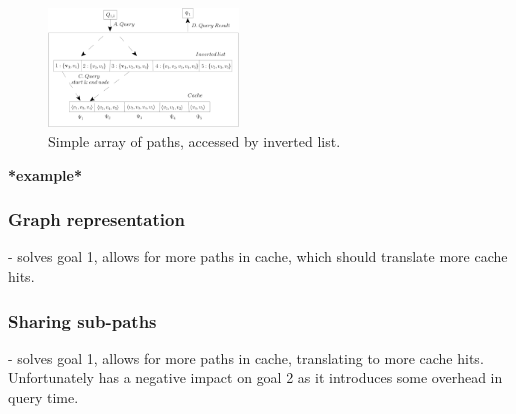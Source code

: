 \begin{figure}[hbt]
  \center
        \includegraphics[width=0.45\textwidth]{figures/cachearrayinvertlist.pdf}
        \caption{Simple array of paths, accessed by inverted list.}
  \label{fig:cacheinvertlist}
\end{figure}

\textbf{*example*}

\subsubsection{Graph representation} - solves goal 1, allows for more paths in cache, which should translate more cache hits.

\subsubsection{Sharing sub-paths} - solves goal 1, allows for more paths in cache, translating to more cache hits. Unfortunately has a negative impact on goal 2 as it introduces some overhead in query time.


